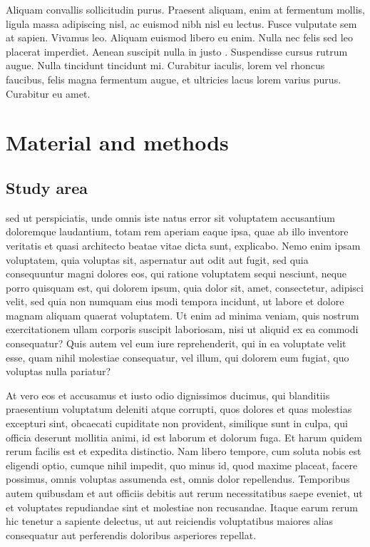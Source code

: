\documentclass[a4paper,12pt]{article}
\begin{document}
Aliquam convallis sollicitudin purus. Praesent aliquam, enim at fermentum mollis, ligula
massa adipiscing nisl, ac euismod nibh nisl eu lectus. Fusce vulputate sem at
sapien. Vivamus leo. Aliquam euismod libero eu enim. Nulla nec felis sed leo placerat
imperdiet. Aenean suscipit nulla in justo
\citep{Morrison_2006_Bk,Pimlott_1967,Quinn_2003}. Suspendisse cursus rutrum augue. Nulla
tincidunt tincidunt mi. Curabitur iaculis, lorem vel rhoncus faucibus, felis magna
fermentum augue, et ultricies lacus lorem varius purus. Curabitur eu amet.


\section*{Material and methods}


\subsection*{Study area}

\citet{Fournier_1982} sed ut perspiciatis, unde omnis iste natus error sit voluptatem
accusantium doloremque laudantium, totam rem aperiam eaque ipsa, quae ab illo inventore
veritatis et quasi architecto beatae vitae dicta sunt, explicabo. Nemo enim ipsam
voluptatem, quia voluptas sit, aspernatur aut odit aut fugit, sed quia consequuntur magni
dolores eos, qui ratione voluptatem sequi nesciunt, neque porro quisquam est, qui dolorem
ipsum, quia dolor sit, amet, consectetur, adipisci velit, sed quia non numquam eius modi
tempora incidunt, ut labore et dolore magnam aliquam quaerat voluptatem. Ut enim ad minima
veniam, quis nostrum exercitationem ullam corporis suscipit laboriosam, nisi ut aliquid ex
ea commodi consequatur? Quis autem vel eum iure reprehenderit, qui in ea voluptate velit
esse, quam nihil molestiae consequatur, vel illum, qui dolorem eum fugiat, quo voluptas
nulla pariatur? 

At vero eos et accusamus et iusto odio dignissimos ducimus, qui blanditiis praesentium
voluptatum deleniti atque corrupti, quos dolores et quas molestias excepturi sint,
\citet{Hirzel_2003_PROC,Holand_1998,Looijen_1998_PhD} obcaecati cupiditate non provident,
similique sunt in culpa, qui officia deserunt mollitia animi, id est laborum et dolorum
fuga. Et harum quidem rerum facilis est et expedita distinctio. Nam libero tempore, cum
soluta nobis est eligendi optio, cumque nihil impedit, quo minus id, quod maxime placeat,
facere possimus, omnis voluptas assumenda est, omnis dolor repellendus. Temporibus autem
quibusdam et aut officiis debitis aut rerum necessitatibus saepe eveniet, ut et voluptates
repudiandae sint et molestiae non recusandae. Itaque earum rerum hic tenetur a sapiente
delectus, ut aut reiciendis voluptatibus maiores alias consequatur aut perferendis
doloribus asperiores repellat.
\end{document}
